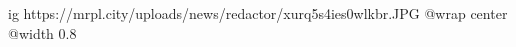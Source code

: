  
 
 
 
 

\ifcmt
  ig https://mrpl.city/uploads/news/redactor/xurq5s4ies0wlkbr.JPG
  @wrap center
  @width 0.8
\fi
